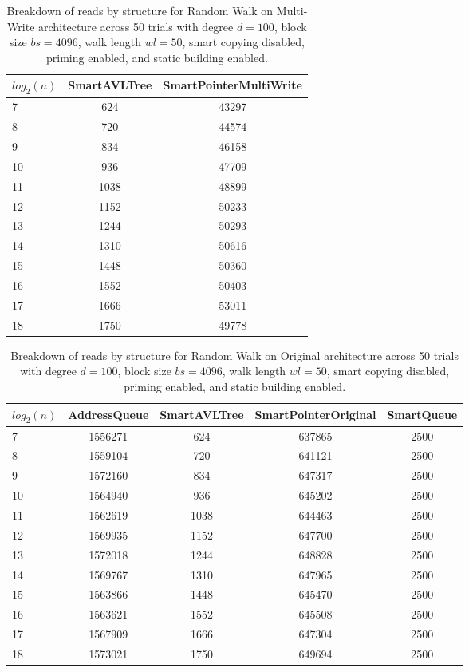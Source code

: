 \begin{table}[]
\centering
\begin{tabular}{|l|c|c|}
$log_2(n)$ & SmartAVLTree & SmartPointerMultiWrite \\ \hline
7 & 624 & 43297 \\ \hline
8 & 720 & 44574 \\ \hline
9 & 834 & 46158 \\ \hline
10 & 936 & 47709 \\ \hline
11 & 1038 & 48899 \\ \hline
12 & 1152 & 50233 \\ \hline
13 & 1244 & 50293 \\ \hline
14 & 1310 & 50616 \\ \hline
15 & 1448 & 50360 \\ \hline
16 & 1552 & 50403 \\ \hline
17 & 1666 & 53011 \\ \hline
18 & 1750 & 49778 \\ \hline
\end{tabular}
\caption{Breakdown of reads by structure for Random Walk on Multi-Write architecture across 50 trials with degree $d=100$, block size $bs=4096$, walk length $wl=50$, smart copying disabled, priming enabled, and static building enabled.}
    \label{tab:reads_by_structure_rw_d100_bs4096_trials50_copiesfalse_primetrue_staticinsertiontrue_wl50_ptmultiwrite_movetrue}
\end{table}

\begin{table}[]
\centering
\begin{tabular}{|l|c|c|c|c|}
$log_2(n)$ & AddressQueue & SmartAVLTree & SmartPointerOriginal & SmartQueue \\ \hline
7 & 1556271 & 624 & 637865 & 2500 \\ \hline
8 & 1559104 & 720 & 641121 & 2500 \\ \hline
9 & 1572160 & 834 & 647317 & 2500 \\ \hline
10 & 1564940 & 936 & 645202 & 2500 \\ \hline
11 & 1562619 & 1038 & 644463 & 2500 \\ \hline
12 & 1569935 & 1152 & 647700 & 2500 \\ \hline
13 & 1572018 & 1244 & 648828 & 2500 \\ \hline
14 & 1569767 & 1310 & 647965 & 2500 \\ \hline
15 & 1563866 & 1448 & 645470 & 2500 \\ \hline
16 & 1563621 & 1552 & 645508 & 2500 \\ \hline
17 & 1567909 & 1666 & 647304 & 2500 \\ \hline
18 & 1573021 & 1750 & 649694 & 2500 \\ \hline
\end{tabular}
\caption{Breakdown of reads by structure for Random Walk on Original architecture across 50 trials with degree $d=100$, block size $bs=4096$, walk length $wl=50$, smart copying disabled, priming enabled, and static building enabled.}
    \label{tab:reads_by_structure_rw_d100_bs4096_trials50_copiesfalse_primetrue_staticinsertiontrue_wl50_ptoriginal_movefalse}
\end{table}

